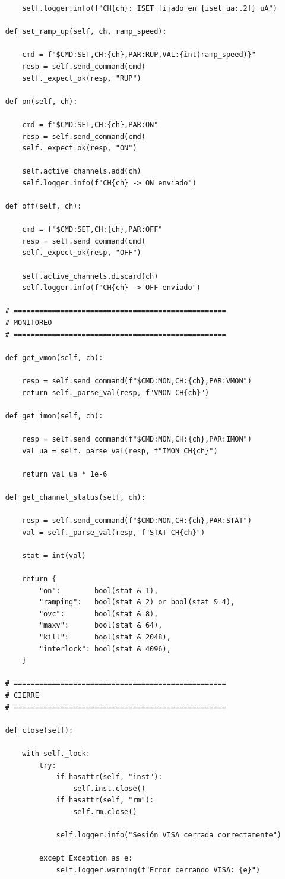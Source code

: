 \documentclass{article}
\begin{document}
\begin{lstlisting}
        self.logger.info(f"CH{ch}: ISET fijado en {iset_ua:.2f} uA")

    def set_ramp_up(self, ch, ramp_speed):

        cmd = f"$CMD:SET,CH:{ch},PAR:RUP,VAL:{int(ramp_speed)}"
        resp = self.send_command(cmd)
        self._expect_ok(resp, "RUP")

    def on(self, ch):

        cmd = f"$CMD:SET,CH:{ch},PAR:ON"
        resp = self.send_command(cmd)
        self._expect_ok(resp, "ON")

        self.active_channels.add(ch)
        self.logger.info(f"CH{ch} -> ON enviado")

    def off(self, ch):

        cmd = f"$CMD:SET,CH:{ch},PAR:OFF"
        resp = self.send_command(cmd)
        self._expect_ok(resp, "OFF")

        self.active_channels.discard(ch)
        self.logger.info(f"CH{ch} -> OFF enviado")

    # ==================================================
    # MONITOREO
    # ==================================================

    def get_vmon(self, ch):

        resp = self.send_command(f"$CMD:MON,CH:{ch},PAR:VMON")
        return self._parse_val(resp, f"VMON CH{ch}")

    def get_imon(self, ch):

        resp = self.send_command(f"$CMD:MON,CH:{ch},PAR:IMON")
        val_ua = self._parse_val(resp, f"IMON CH{ch}")

        return val_ua * 1e-6

    def get_channel_status(self, ch):

        resp = self.send_command(f"$CMD:MON,CH:{ch},PAR:STAT")
        val = self._parse_val(resp, f"STAT CH{ch}")

        stat = int(val)

        return {
            "on":        bool(stat & 1),
            "ramping":   bool(stat & 2) or bool(stat & 4),
            "ovc":       bool(stat & 8),
            "maxv":      bool(stat & 64),
            "kill":      bool(stat & 2048),
            "interlock": bool(stat & 4096),
        }

    # ==================================================
    # CIERRE
    # ==================================================

    def close(self):

        with self._lock:
            try:
                if hasattr(self, "inst"):
                    self.inst.close()
                if hasattr(self, "rm"):
                    self.rm.close()

                self.logger.info("Sesión VISA cerrada correctamente")

            except Exception as e:
                self.logger.warning(f"Error cerrando VISA: {e}")

\end{lstlisting}
\end{document}
